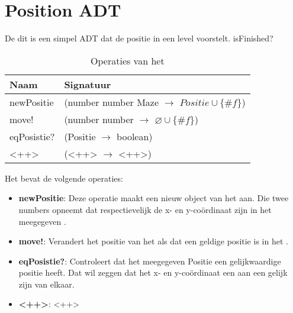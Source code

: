 
\section{Position ADT}
\label{section:positie}

De \texttt{} dit is een simpel ADT dat de positie in een level voorstelt.
isFinished?

\begin{table}[hbt]
\centering
\begin{tabular}{|ll|}
\hline
\rowcolor[HTML]{000000} 
{\color[HTML]{FFFFFF} \textbf{Naam}} & {\color[HTML]{FFFFFF} \textbf{Signatuur}} \\ \hline
newPositie                          & (number number Maze $\rightarrow$ $Positie\cup\{\#f\}$)                                       \\ \hline
move!                                & (number number $\rightarrow$ $\varnothing\cup\{\#f\}$)                                       \\ \hline
 eqPosistie?                                & (Positie $\rightarrow$ boolean)                                       \\ \hline
 <++>                                & (<++> $\rightarrow$ <++>)                                       \\ \hline
\end{tabular}
\caption{Operaties van het \texttt{}}
\label{table:positie}
\end{table}

Het \texttt{} bevat de volgende operaties:

\begin{itemize}
	\item \textbf{newPositie}: Deze operatie maakt een nieuw object van het \texttt{} aan. 
		Die twee numbers opneemt dat respectievelijk de x- en y-co\"ordinaat zijn in het meegegeven \texttt{}.
	\item \textbf{move!}: Verandert het positie van het \texttt{} als dat een geldige positie is in het \texttt{}.
	\item \textbf{eqPosistie?}: Controleert dat het meegegeven Positie een gelijkwaardige positie heeft.
		Dat wil zeggen dat het x- en y-co\"ordinaat een aan een gelijk zijn van elkaar. 
	\item \textbf{<++>}: <++>
\end{itemize}

